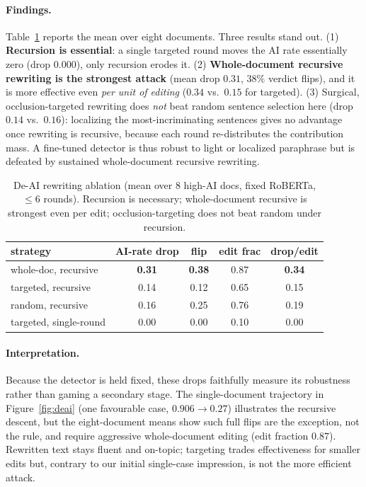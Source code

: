 \documentclass[11pt]{article}
\begin{document}
\paragraph{Findings.} Table~\ref{tab:robust} reports the mean over eight
documents. Three results stand out. (1) \textbf{Recursion is essential}: a
single targeted round moves the AI rate essentially zero (drop $0.000$), only
recursion erodes it. (2) \textbf{Whole-document recursive rewriting is the
strongest attack} (mean drop $0.31$, $38\%$ verdict flips), and it is more
effective even \emph{per unit of editing} ($0.34$ vs.\ $0.15$ for targeted).
(3) Surgical, occlusion-targeted rewriting does \emph{not} beat random sentence
selection here (drop $0.14$ vs.\ $0.16$): localizing the most-incriminating
sentences gives no advantage once rewriting is recursive, because each round
re-distributes the contribution mass. A fine-tuned detector is thus robust to
light or localized paraphrase but is defeated by sustained whole-document
recursive rewriting.

\begin{table}[t]\centering\small
\begin{tabular}{lcccc}
\toprule
strategy & AI-rate drop & flip & edit frac & drop/edit \\
\midrule
whole-doc, recursive & \textbf{0.31} & \textbf{0.38} & 0.87 & \textbf{0.34} \\
targeted, recursive & 0.14 & 0.12 & 0.65 & 0.15 \\
random, recursive & 0.16 & 0.25 & 0.76 & 0.19 \\
targeted, single-round & 0.00 & 0.00 & 0.10 & 0.00 \\
\bottomrule
\end{tabular}
\caption{De-AI rewriting ablation (mean over 8 high-AI docs, fixed RoBERTa,
$\leq$6 rounds). Recursion is necessary; whole-document recursive is strongest
even per edit; occlusion-targeting does not beat random under recursion.}
\label{tab:robust}
\end{table}

\paragraph{Interpretation.} Because the detector is held fixed, these drops
faithfully measure its robustness rather than gaming a secondary stage. The
single-document trajectory in Figure~\ref{fig:deai} (one favourable case,
$0.906\!\rightarrow\!0.27$) illustrates the recursive descent, but the
eight-document means show such full flips are the exception, not the rule, and
require aggressive whole-document editing (edit fraction $0.87$). Rewritten
text stays fluent and on-topic; targeting trades effectiveness for smaller
edits but, contrary to our initial single-case impression, is not the more
efficient attack.
\end{document}
